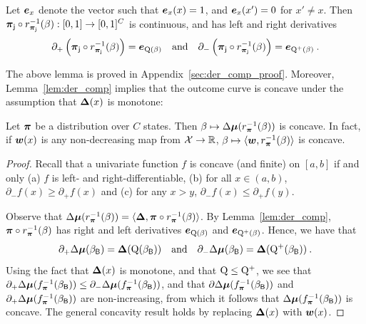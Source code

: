 	\begin{lem}\label{lem:der_comp} Let $\boldsymbol{e}_{x}$ denote the vector such that $\boldsymbol{e}_x(x) = 1$, and $\boldsymbol{e}_x(x') = 0$ for $x' \ne x$. Then $\boldsymbol{\pi}_{\mathsf{j}} \circ r_{\boldsymbol{\pi}_{\mathsf{j}}}^{-1}(\beta): [0,1] \to [0,1]^{C}$ is continuous, and has left and right derivatives 
	\begin{eqnarray}
	\partial_+ \left(\boldsymbol{\pi}_{\mathsf{j}} \circ r_{\boldsymbol{\pi}_{\mathsf{j}}}^{-1}(\beta)\right) = \boldsymbol{e}_{\mathrm{Q}(\beta)} 
	\quad \text{and}\quad \partial_- \left(\boldsymbol{\pi}_{\mathsf{j}} \circ r_{\boldsymbol{\pi}_{\mathsf{j}}}^{-1}(\beta) \right)= \boldsymbol{e}_{\mathrm{Q}^+(\beta)} \:.
	\end{eqnarray}
	\end{lem}
	The above lemma is proved in Appendix~\ref{sec:der_comp_proof}. Moreover, Lemma~\ref{lem:der_comp} implies that the outcome curve is concave under the assumption that $\boldsymbol{\Delta}(x)$ is monotone:
	\begin{prop}\label{prop:beta_concavity} Let $\boldsymbol{\pi}$ be a distribution over $C$ states. Then $\beta \mapsto \Delta\boldsymbol{\mu}(r_{\boldsymbol{\pi}}^{-1}(\beta))$ is concave. In fact, if $\boldsymbol{w}(x)$ is any non-decreasing map from $\mathcal{X} \to \mathbb{R}$, $\beta \mapsto \langle \boldsymbol{w}, r_{\boldsymbol{\pi}}^{-1}(\beta) \rangle$ is concave.
	\end{prop}
		\begin{proof} 
		Recall that a univariate function $f$ is concave (and finite) on $[a,b]$ if and only (a) $f$ is left- and right-differentiable, (b) for all $x \in (a,b)$, $\partial_-f(x) \ge \partial_+f(x)$ and (c) for any $x > y$, $\partial_- f(x) \le \partial_+ f(y)$.  

		Observe that $\Delta\boldsymbol{\mu}(r_{\boldsymbol{\pi}}^{-1}(\beta)) = \langle \boldsymbol{\Delta}, \boldsymbol{\pi} \circ  r_{\boldsymbol{\pi}}^{-1}(\beta) \rangle $. By Lemma~\ref{lem:der_comp}, $\boldsymbol{\pi} \circ  r_{\boldsymbol{\pi}}^{-1}(\beta)$ has right and left derivatives $\boldsymbol{e}_{\mathrm{Q}(\beta)}$ and $\boldsymbol{e}_{\mathrm{Q}^+(\beta)}$. Hence, we have that
		\begin{eqnarray}
		\partial_+ \Delta\boldsymbol{\mu}(\beta_{\mathsf{B}}) = \boldsymbol{\Delta}(\mathrm{Q}(\beta_{\mathsf{B}}))\quad\text{and}\quad \partial_- \Delta\boldsymbol{\mu}(\beta_{\mathsf{B}}) = \boldsymbol{\Delta}(\mathrm{Q}^+(\beta_{\mathsf{B}})) \:.
		\end{eqnarray}
		Using the fact that $\boldsymbol{\Delta}(x)$ is monotone, and that $\mathrm{Q} \le \mathrm{Q}^+$, we see that $\partial_+ \Delta\boldsymbol{\mu}(f_{\boldsymbol{\pi}}^{-1}(\beta_{\mathsf{B}})) \le \partial_- \Delta\boldsymbol{\mu}(f_{\boldsymbol{\pi}}^{-1}(\beta_{\mathsf{B}}))  $, and that $\partial \Delta\boldsymbol{\mu}(f_{\boldsymbol{\pi}}^{-1}(\beta_{\mathsf{B}}))$ and $\partial_+ \Delta\boldsymbol{\mu}(f_{\boldsymbol{\pi}}^{-1}(\beta_{\mathsf{B}}))$ are non-increasing, from which it follows that $\Delta\boldsymbol{\mu}(f_{\boldsymbol{\pi}}^{-1}(\beta_{\mathsf{B}}))$ is concave. The general concavity result holds by replacing $\boldsymbol{\Delta}(x)$ with $\boldsymbol{w}(x)$.
		\end{proof} 


